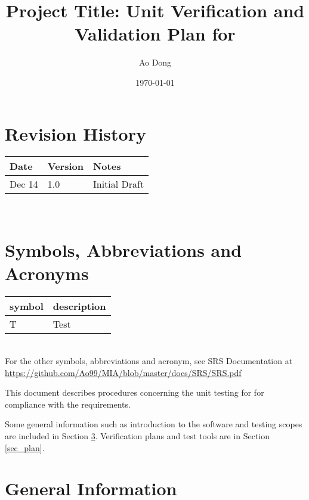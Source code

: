 \documentclass[12pt, titlepage]{article}
\begin{document}
\title{Project Title: Unit Verification and Validation Plan for \progname{}} 
\author{Ao Dong}
\date{\today}
	
\maketitle


\section{Revision History}

\begin{tabularx}{\textwidth}{p{3cm}p{2cm}X}
\toprule {\bf Date} & {\bf Version} & {\bf Notes}\\
\midrule
Dec 14 & 1.0 & Initial Draft\\
\bottomrule
\end{tabularx}

~\newpage

\tableofcontents

\listoftables

\newpage

\section{Symbols, Abbreviations and Acronyms}

\renewcommand{\arraystretch}{1.2}
\begin{tabular}{l l} 
  \toprule		
  \textbf{symbol} & \textbf{description}\\
  \midrule 
  T & Test\\
  \bottomrule
\end{tabular}\\

For the other symbols, abbreviations and acronym, see SRS Documentation at
\url{https://github.com/Ao99/MIA/blob/master/docs/SRS/SRS.pdf}

\newpage


This document describes procedures concerning the unit testing for \progname{}
for compliance with the requirements.

Some general information such as introduction to the software and testing
scopes are included in Section \ref{sec_geinfo}. Verification plans and
test tools are in Section \ref{sec_plan}.

\section{General Information}
\label{sec_geinfo}
\end{document}
